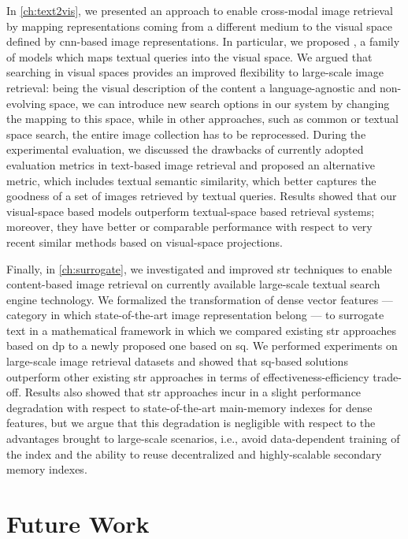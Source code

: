 In \ref{ch:text2vis}, we presented an approach to enable cross-modal image retrieval by mapping representations coming from a different medium to the visual space defined by \gls{cnn}-based image representations.
In particular, we proposed \ttv{}, a family of models which maps textual queries into the visual space.
We argued that searching in visual spaces provides an improved flexibility to large-scale image retrieval: being the visual description of the content a language-agnostic and non-evolving space, we can introduce new search options in our system by changing the mapping to this space, while in other approaches, such as common or textual space search, the entire image collection has to be reprocessed.
During the experimental evaluation, we discussed the drawbacks of currently adopted evaluation metrics in text-based image retrieval and proposed an alternative metric, which includes textual semantic similarity, which better captures the goodness of a set of images retrieved by textual queries.
Results showed that our visual-space based models outperform textual-space based retrieval systems;
moreover, they have better or comparable performance with respect to very recent similar methods based on visual-space projections.

Finally, in \ref{ch:surrogate}, we investigated and improved \acrfull{str} techniques to enable content-based image retrieval on currently available large-scale textual search engine technology.
We formalized the transformation of dense vector features --- category in which state-of-the-art image representation belong --- to surrogate text in a mathematical framework in which we compared existing \gls{str} approaches based on \acrlong{dp} to a newly proposed one based on \acrfull{sq}.
We performed experiments on large-scale image retrieval datasets and showed that \gls{sq}-based solutions outperform other existing \gls{str} approaches in terms of effectiveness-efficiency trade-off.
Results also showed that \gls{str} approaches incur in a slight performance degradation with respect to state-of-the-art main-memory indexes for dense features, but we argue that this degradation is negligible with respect
 to the advantages brought to large-scale scenarios, i.e., avoid data-dependent training of the index and the ability to reuse decentralized and highly-scalable secondary memory indexes.

\section{Future Work}

